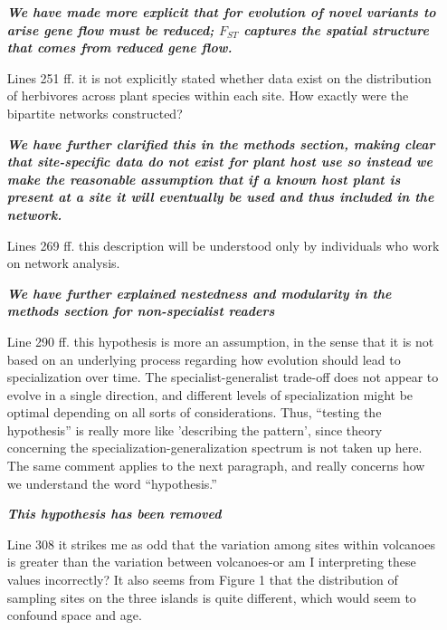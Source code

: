 \documentclass[12pt]{article}
\begin{document}
\begin{itemize}
\textit{\textbf{We have made more explicit that for evolution of novel
  variants to arise gene flow must be reduced; $F_{ST}$ captures the
  spatial structure that comes from reduced gene flow.}}
%
\item[Lines 251 ff.] it is not explicitly stated whether data exist
  on the distribution of herbivores across plant species within each
  site. How exactly were the bipartite networks constructed?

  \textit{\textbf{We have further clarified this in the methods
      section, making clear that site-specific data do not exist for
      plant host use so instead we make the reasonable assumption that
      if a known host plant is present at a site it will eventually be
      used and thus included in the network.}}
%
\item[Lines 269 ff.] this description will be understood only by
  individuals who work on network analysis.

  \textit{\textbf{We have further explained nestedness and modularity
      in the methods section for non-specialist readers}}
%
\item[Line 290 ff.] this hypothesis is more an assumption, in the
  sense that it is not based on an underlying process regarding how
  evolution should lead to specialization over time. The
  specialist-generalist trade-off does not appear to evolve in a
  single direction, and different levels of specialization might be
  optimal depending on all sorts of considerations. Thus, ``testing the
  hypothesis'' is really more like 'describing the pattern', since
  theory concerning the specialization-generalization spectrum is not
  taken up here. The same comment applies to the next paragraph, and
  really concerns how we understand the word ``hypothesis.''

  \textit{\textbf{This hypothesis has been removed}}
%
\item[Line 308] it strikes me as odd that the variation among sites
  within volcanoes is greater than the variation between volcanoes-or
  am I interpreting these values incorrectly? It also seems from
  Figure 1 that the distribution of sampling sites on the three
  islands is quite different, which would seem to confound space and
  age.


\end{itemize}
\end{document}
